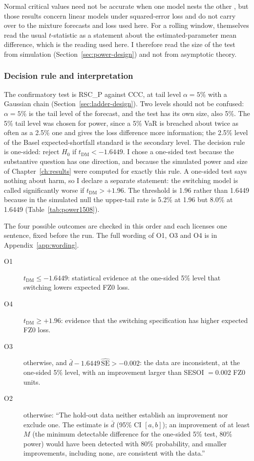 Normal critical values need not be accurate when one model nests the other \citep{clark2001,clark2007}, but those results concern linear models under squared-error loss and do not carry over to the mixture forecasts and loss used here. For a rolling window, \citet{clark2007} themselves read the usual $t$-statistic as a statement about the estimated-parameter mean difference, which is the reading used here. I therefore read the size of the test from simulation (Section~\ref{sec:power-design}) and not from asymptotic theory.

\subsubsection{Decision rule and interpretation}\label{sec:decision-rule}

The confirmatory test is RSC\_P against CCC, at tail level $\alpha=5\%$ with a Gaussian chain (Section~\ref{sec:ladder-design}). Two levels should not be confused: $\alpha=5\%$ is the tail level of the forecast, and the test has its own size, also 5\%. The 5\% tail level was chosen for power, since a 5\% VaR is breached about twice as often as a 2.5\% one and gives the loss difference more information; the 2.5\% level of the Basel expected-shortfall standard is the secondary level. The decision rule is one-sided: reject $H_0$ if $t_{\mathrm{DM}}<-1.6449$. I chose a one-sided test because the substantive question has one direction, and because the simulated power and size of Chapter~\ref{ch:results} were computed for exactly this rule. A one-sided test says nothing about harm, so I declare a separate statement: the switching model is called significantly worse if $t_{\mathrm{DM}}>+1.96$. The threshold is 1.96 rather than 1.6449 because in the simulated null the upper-tail rate is 5.2\% at 1.96 but 8.0\% at 1.6449 (Table~\ref{tab:power1508}).

The four possible outcomes are checked in this order and each licenses one sentence, fixed before the run. The full wording of O1, O3 and O4 is in Appendix~\ref{app:wording}.
\begin{description}
\item[O1] $t_{\mathrm{DM}}\le-1.6449$: statistical evidence at the one-sided 5\% level that switching lowers expected FZ0 loss.
\item[O4] $t_{\mathrm{DM}}\ge+1.96$: evidence that the switching specification has higher expected FZ0 loss.
\item[O3] otherwise, and $\bar d-1.6449\,\widehat{\mathrm{SE}}>-0.002$: the data are inconsistent, at the one-sided 5\% level, with an improvement larger than SESOI $=0.002$ FZ0 units.
\item[O2] otherwise: ``The hold-out data neither establish an improvement nor exclude one. The estimate is $\bar d$ (95\% CI $[a,b]$); an improvement of at least $M$ (the minimum detectable difference for the one-sided 5\% test, 80\% power) would have been detected with 80\% probability, and smaller improvements, including none, are consistent with the data.''
\end{description}

